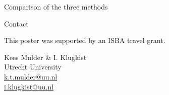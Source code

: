 \documentclass[final]{beamer}
\begin{document}
\begin{frame}
\begin{textblock}{26.5}
\begin{block}{Comparison of the three methods}
\end{block}


\vspace{\TPHorizModule}

\begin{block}{Contact}
\begin{small}
This poster was supported by an ISBA travel grant.

Kees Mulder \& I. Klugkist\\
Utrecht University \\
\url{k.t.mulder@uu.nl}\\
\url{i.klugkist@uu.nl}
\end{small}
\vspace{-0.5cm}
\end{block}
%
%
%
%
%
\end{textblock}
\end{frame}
\end{document}
